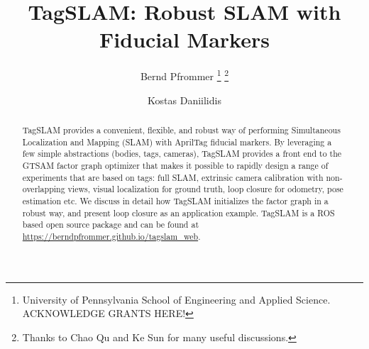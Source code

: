 \documentclass[letterpaper, 10 pt]{IEEEconf}
\begin{document}
\title{\LARGE \bf TagSLAM: Robust SLAM with Fiducial Markers}
\author{
Bernd Pfrommer
\footnote{University of Pennsylvania School of Engineering and Applied
Science. ACKNOWLEDGE GRANTS HERE!}
\footnote{Thanks to Chao Qu and Ke Sun for many useful discussions.}
\\
\and
Kostas Daniilidis\footnotemark[1]
}

\maketitle
\begin{abstract}
TagSLAM provides a convenient, flexible, and robust way of performing
Simultaneous Localization and Mapping (SLAM) with AprilTag fiducial
markers. By leveraging a few simple abstractions (bodies, tags,
cameras), TagSLAM provides a front end to the GTSAM factor graph
optimizer that makes it possible to rapidly design a range of
experiments that are based on tags: full SLAM, extrinsic camera
calibration with non-overlapping views, visual localization for ground
truth, loop closure for odometry, pose estimation etc. We discuss in
detail how TagSLAM initializes the factor graph in a robust way, and
present loop closure as an application example.  TagSLAM is a ROS
based open source package and can be found
at \url{https://berndpfrommer.github.io/tagslam_web}.
\end{abstract}







\balance


\end{document}
